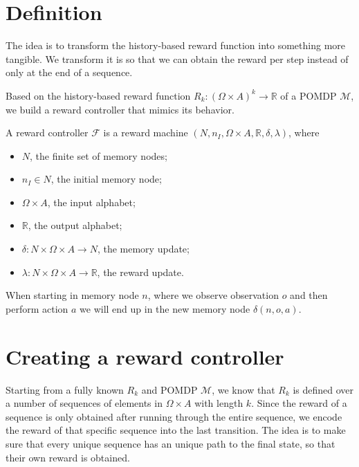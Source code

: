 \section{Definition}


The idea is to transform the history-based reward function into something more tangible. We transform it is so that we can obtain the reward per step instead of only at the end of a sequence.


Based on the history-based reward function $R_k:(\Omega\times A)^k\to\mathbb{R}$ of a POMDP $\mathcal{M}$, we build a reward controller that mimics its behavior.


\begin{definition}
	A reward controller $\mathcal{F}$ is a reward machine $(N,n_I, \Omega\times A, \mathbb{R}, \delta, \lambda)$, where
	\begin{itemize}
		\item $N$, the finite set of memory nodes;
		\item $n_I\in N$, the initial memory node;
		\item $\Omega\times A$, the input alphabet;
		\item $\mathbb{R}$, the output alphabet;
		\item $\delta: N \times \Omega \times A \to N$, the memory update;
		\item $\lambda: N \times \Omega \times A \to \mathbb{R}$, the reward update. 
	\end{itemize}
\end{definition}


When starting in memory node $n$, where we observe observation $o$ and then perform action $a$ we will end up in the new memory node $\delta(n,o,a)$.

\section{Creating a reward controller}
Starting from a fully known $R_k$ and POMDP $\mathcal{M}$, we know that $R_k$ is defined over a number of sequences of elements in $\Omega\times A$ with length $k$. Since the reward of a sequence is only obtained after running through the entire sequence, we encode the reward of that specific sequence into the last transition. The idea is to make sure that every unique sequence has an unique path to the final state, so that their own reward is obtained.

